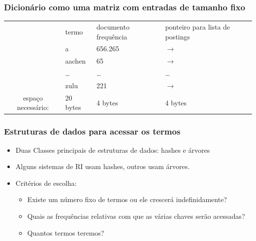 \documentclass[compress]{beamer}
\begin{document}
\begin{frame}
\frametitle{Dicionário como uma matriz com entradas de tamanho fixo}

\begin{tabular}{l|lp{2cm}p{2cm}|}\cline{2-4}
&termo & documento frequência & ponteiro para %
lista de postings 

\\\cline{2-4}
&a &656.265  & $\longrightarrow$ \\
&aachen &65 & $\longrightarrow$ \\
&\ldots & \ldots & \ldots \\
&zulu & 221 & $\longrightarrow$ \\\cline{2-4}
\multicolumn{1}{c}{espaço necessário:}& 20 bytes & 4 bytes & 
\multicolumn{1}{l}{4 bytes}
\\
\end{tabular}

\bigskip


\end{frame}

\begin{frame}
\frametitle{Estruturas de dados para acessar os termos}
\begin{itemize}[<+->]
\item Duas Classes principais de estruturas de dados: hashes e árvores
\item Alguns sistemas de RI usam hashes, outros usam árvores.
\item Critérios de escolha:
\begin{itemize}[<+->]
\item Existe um número fixo de termos ou ele crescerá indefinidamente?
\item Quais as frequências relativas com que as várias chaves serão 
acessadas?
\item Quantos termos teremos?
\end{itemize}
\end{itemize}
\end{frame}
\end{document}
